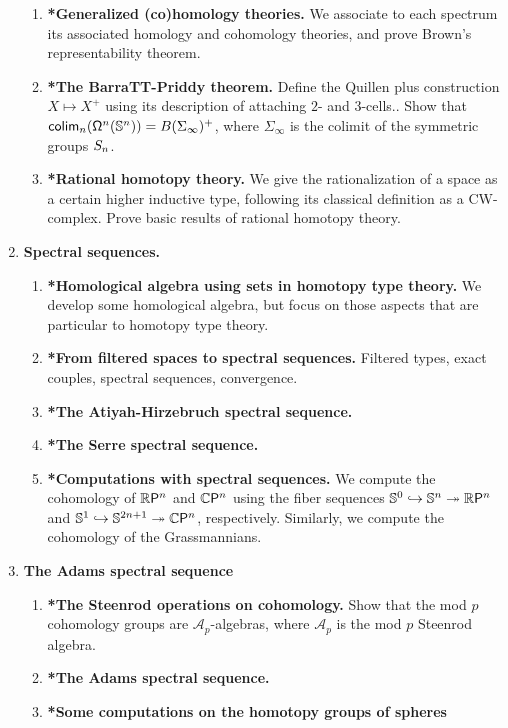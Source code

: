 \documentclass[reqno]{amsart}
\begin{document}
\begin{enumerate}[label=\arabic*.]
\begin{enumerate}[label*=\arabic*.]
\item \textbf{*Generalized (co)homology theories.} We associate to each spectrum its associated homology and cohomology theories, and prove Brown's representability theorem.
\item \textbf{*The BarraTT-Priddy theorem.} Define the Quillen plus construction $X\mapsto X^+$ using its description of attaching $2$- and $3$-cells.. Show that $\colim_n(\loopspace[n]{\sphere{n}})= B(\Sigma_\infty)^+$, where $\Sigma_\infty$ is the colimit of the symmetric groups $\symmetric{n}$. 
\item \textbf{*Rational homotopy theory.} We give the rationalization of a space as a certain higher inductive type, following its classical definition as a CW-complex. Prove basic results of rational homotopy theory. 
\end{enumerate}
\item \textbf{Spectral sequences.}
\begin{enumerate}[label*=\arabic*.]
\item \textbf{*Homological algebra using sets in homotopy type theory.} We develop some homological algebra, but focus on those aspects that are particular to homotopy type theory.
\item \textbf{*From filtered spaces to spectral sequences.} Filtered types, exact couples, spectral sequences, convergence.
\item \textbf{*The Atiyah-Hirzebruch spectral sequence.} 
\item \textbf{*The Serre spectral sequence.} 
\item \textbf{*Computations with spectral sequences.} We compute the cohomology of $\rprojective{n}$ and $\cprojective{n}$ using the fiber sequences $\sphere{0}\hookrightarrow\sphere{n}\fibration\rprojective{n}$ and $\sphere{1}\hookrightarrow\sphere{2n+1}\fibration\cprojective{n}$, respectively. Similarly, we compute the cohomology of the Grassmannians. 
\end{enumerate}
\item \textbf{The Adams spectral sequence}
\begin{enumerate}[label*=\arabic*.]
\item \textbf{*The Steenrod operations on cohomology.} Show that the mod $p$ cohomology groups are $\mathcal{A}_p$-algebras, where $\mathcal{A}_p$ is the mod $p$ Steenrod algebra.
\item \textbf{*The Adams spectral sequence.}
\item \textbf{*Some computations on the homotopy groups of spheres}

\end{enumerate}
\end{enumerate}
\end{document}
